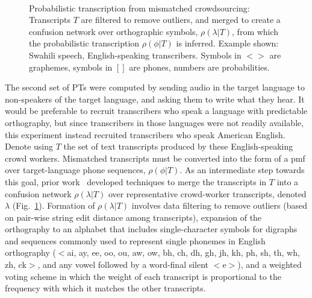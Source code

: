 \begin{figure}[b!]
\begin{center}
\\
\end{center}
\setlength{\abovecaptionskip}{0pt}
\caption{Probabilistic transcription from mismatched crowdsourcing:
  Transcripts $T$ are filtered to remove outliers, and merged to
  create a confusion network over orthographic symbols,
  $\rho(\lambda|T)$, from which the probabilistic transcription
  $\rho(\phi|T)$ is inferred. Example shown: Swahili speech,
  English-speaking transcribers.  Symbols in $<$$>$ are graphemes,
  symbols in $[]$ are phones, numbers are probabilities.}
\label{fig:mcmethods}
\end{figure}

The second set of PTs were computed by sending audio in the target
language to non-speakers of the target language, and asking them to
write what they hear.  It would be preferable to recruit transcribers
who speak a language with predictable orthography, but since
transcribers in those languages were not readily available, this
experiment instead recruited transcribers who speak American English.
Denote using $T$ the set of text
transcripts produced by these English-speaking crowd workers.
Mismatched transcripts must be converted into the form of a pmf over
target-language phone sequences, $\rho(\phi|T)$.  As an intermediate
step towards this goal, prior work~\cite{JHJ15b} developed techniques
to merge the transcripts in $T$ into a confusion network
$\rho(\lambda|T)$ over representative crowd-worker transcripts,
denoted $\lambda$ (Fig.~\ref{fig:mcmethods}).  Formation of
$\rho(\lambda|T)$ involves data filtering to remove outliers (based on
pair-wise string edit distance among transcripts), expansion of the
orthography to an alphabet that includes
single-character symbols for digraphs and sequences commonly used to represent
single phonemes in English orthography ($<$ai, ay, ee, oo, ou, aw, ow,
bh, ch, dh, gh, jh, kh, ph, sh, th, wh, zh, ck$>$, and any vowel followed by
a word-final silent $<$e$>$), and a weighted
voting scheme in which the weight of each transcript is proportional
to the frequency with which it matches the other transcripts.

